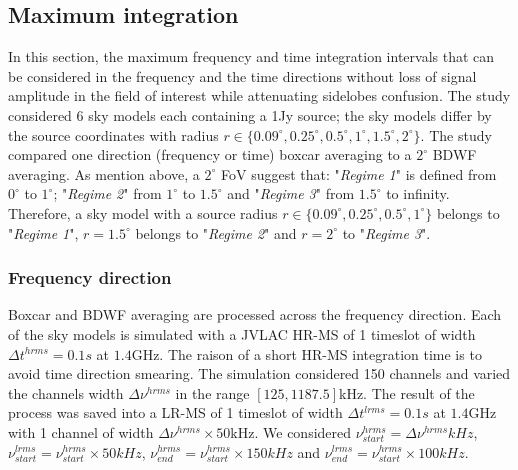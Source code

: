 \documentclass[useAMS,usenatbib]{mn2e}
\begin{document}
% 
\subsection{Maximum integration}
In this section, the maximum frequency and time integration intervals  that can be 
considered in the frequency and the time 
directions without loss of signal amplitude in the field of interest while attenuating sidelobes confusion. The study considered $6$ sky 
models each  containing a 1Jy source; the sky models differ by the source 
coordinates with radius $r\in\{0.09^\circ,0.25^\circ,0.5^\circ,1^\circ,1.5^\circ, 2^\circ\}$. The study compared one direction (frequency 
or time) boxcar averaging to a $2^\circ$ BDWF averaging. As mention above, a $2^{\circ}$ FoV suggest that: "\textit{Regime 1}" 
is defined from $0^\circ$ to $1^\circ$; "\textit{Regime 2}" from $1^\circ$ to $1.5^\circ$ and "\textit{Regime 3}" from $1.5^\circ$ to 
infinity. Therefore, a sky model with a source radius $r\in\{0.09^\circ,0.25^\circ,0.5^\circ,1^\circ\}$ belongs to "\textit{Regime 1}", 
$r= 1.5^\circ$ belongs to  "\textit{Regime 2}" and $r=2^\circ$ to "\textit{Regime 3}".
\subsubsection{Frequency direction}
Boxcar and BDWF averaging are processed across the frequency direction.
Each of the sky models is simulated with a JVLAC HR-MS of 1 timeslot of width $\Delta t^{hrms}=0.1s$ at $1.4$GHz. The raison of a short 
HR-MS 
integration time is to avoid time direction smearing. The simulation considered 150 channels and varied the channels width $\Delta 
\nu^{hrms}$ in the range $[125,1187.5]$kHz. The result of the process was saved into a LR-MS of 1 timeslot of width $\Delta 
t^{lrms}=0.1s$ at $1.4$GHz with 1 
channel of width $\Delta \nu^{hrms}\times50$kHz. We considered $\nu^{hrms}_{start}=\Delta \nu^{hrms}kHz$, 
$\nu^{lrms}_{start}=\nu^{hrms}_{start}\times50 kHz$, $\nu^{hrms}_{end}=\nu^{hrms}_{start}\times150 kHz$ and 
$\nu^{lrms}_{end}=\nu^{hrms}_{start}\times100 kHz$.
\end{document}
